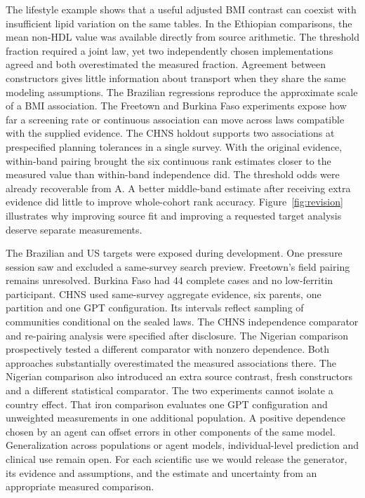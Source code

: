 \documentclass[sigconf,anonymous,review]{acmart}
\begin{document}
The lifestyle example shows that a useful adjusted BMI contrast can coexist with insufficient lipid variation on the same tables. In the Ethiopian comparisons, the mean non-HDL value was available directly from source arithmetic. The threshold fraction required a joint law, yet two independently chosen implementations agreed and both overestimated the measured fraction. Agreement between constructors gives little information about transport when they share the same modeling assumptions. The Brazilian regressions reproduce the approximate scale of a BMI association. The Freetown and Burkina Faso experiments expose how far a screening rate or continuous association can move across laws compatible with the supplied evidence. The CHNS holdout supports two associations at prespecified planning tolerances in a single survey. With the original evidence, within-band pairing brought the six continuous rank estimates closer to the measured value than within-band independence did. The threshold odds were already recoverable from A. A better middle-band estimate after receiving extra evidence did little to improve whole-cohort rank accuracy. Figure~\ref{fig:revision} illustrates why improving source fit and improving a requested target analysis deserve separate measurements.

The Brazilian and US targets were exposed during development. One pressure session saw and excluded a same-survey search preview. Freetown's field pairing remains unresolved. Burkina Faso had 44 complete cases and no low-ferritin participant. CHNS used same-survey aggregate evidence, six parents, one partition and one GPT configuration. Its intervals reflect sampling of communities conditional on the sealed laws. The CHNS independence comparator and re-pairing analysis were specified after disclosure. The Nigerian comparison prospectively tested a different comparator with nonzero dependence. Both approaches substantially overestimated the measured associations there. The Nigerian comparison also introduced an extra source contrast, fresh constructors and a different statistical comparator. The two experiments cannot isolate a country effect. That iron comparison evaluates one GPT configuration and unweighted measurements in one additional population. A positive dependence chosen by an agent can offset errors in other components of the same model. Generalization across populations or agent models, individual-level prediction and clinical use remain open. For each scientific use we would release the generator, its evidence and assumptions, and the estimate and uncertainty from an appropriate measured comparison.



\appendix

\end{document}
